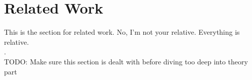 \chapter{Related Work}
This is the section for related work. 
No, I'm not your relative. 
Everything is relative.
\\.
\\
TODO: Make sure this section is dealt with before diving too deep into theory part

